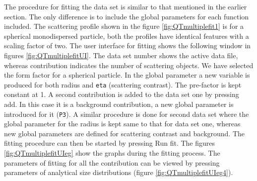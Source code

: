 The procedure for fitting the data set is similar to that mentioned
in the earlier section. The only difference is to include the global
parameters for each function included. The scattering profile shown
in the figure \ref{fig:QTmultiplefit1} is for a spherical
monodispersed particle, both
the profiles have identical features with a scaling factor of two.
The user interface for fitting shows the following window in figures
\ref{fig:QTmultiplefitUI}. The data set number shows the active data file, whereas
contribution indicates the number of scattering objects. We have
selected the form factor for a spherical particle. In the global
parameter a new variable is produced for both radius and \texttt{eta}
(scattering contrast). The pre-factor is kept constant at 1. A
second contribution is added to the data set one by pressing add. In
this case it is a background contribution, a new global parameter is
introduced for it (\texttt{P3}). A similar procedure is done for second data
set where the global parameter for the radius is kept same to that
for data set one, whereas new global parameters are defined for
scattering contrast and background. The fitting procedure can then
be started by pressing Run fit. The figures \ref{fig:QTmultiplefitUIeg}
show the graphs during the fitting process. The parameters of fitting for all the
contribution can be viewed by pressing parameters of analytical size
distributions (figure \ref{fig:QTmultiplefitUIeg4}).

